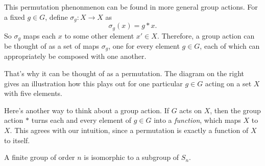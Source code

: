     \begin{minipage}{0.7\textwidth}
        \vspace{.3cm}
        This permutation phenonmenon can be found in more general
        group actions.  For a fixed $g \in G$, define $\sigma_g:
        X \to X$ as 
        \[
            \sigma_g(x) = g * x.
        \] 
        So $\sigma_g$ maps each $x$ to some other element $x' \in X$.
        Therefore, a group action can be thought of as a set of maps
        $\sigma_g$, one for every element $g \in G$, each of which can
        appropriately be composed with one another. 
        
        That's why
        it can be thought of as a permutation. The diagram on the right
        gives an illustration how this plays out for one particular
        $g \in G$ acting on a set $X$ with five elements.
    \end{minipage}\hfill
   \begin{minipage}{0.2\textwidth}
        
    \end{minipage} 
    \vspace{.5cm}

    \textcolor{NavyBlue}{Here's another way to think about a group
    action. If $G$ acts on $X$, then the group action $*$ turns each 
    and every element of $g \in G$ into a \textit{function}, which
    maps $X$ to $X$. This agrees with our intuition, since a
    permutation is exactly a function of $X$ to itself. }
    \begin{thm}
        A finite group of order $n$ is isomorphic to a subgroup of $S_n$.
    \end{thm}
    
